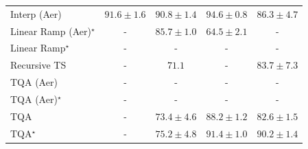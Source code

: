 \begin{tabular}{l|cccc|}
Interp (Aer) & {\cellcolor[HTML]{983404}} \color[HTML]{F1F1F1} $91.6\pm 1.6$ & {\cellcolor[HTML]{A33904}} \color[HTML]{F1F1F1} $90.8\pm 1.4$ & {\cellcolor[HTML]{702806}} \color[HTML]{F1F1F1} $94.6\pm 0.8$ & {\cellcolor[HTML]{D75908}} \color[HTML]{F1F1F1} $86.3\pm 4.7$ \\
Linear Ramp (Aer)$^\star$ & {\cellcolor[HTML]{000000}} \color[HTML]{F1F1F1} {\cellcolor{white}} \color{black} - & {\cellcolor[HTML]{DC5E0B}} \color[HTML]{F1F1F1} $85.7\pm 1.0$ & {\cellcolor[HTML]{FFFFE5}} \color[HTML]{000000} $64.5\pm 2.1$ & {\cellcolor[HTML]{000000}} \color[HTML]{F1F1F1} {\cellcolor{white}} \color{black} - \\
Linear Ramp$^\star$ & {\cellcolor[HTML]{000000}} \color[HTML]{F1F1F1} {\cellcolor{white}} \color{black} - & {\cellcolor[HTML]{000000}} \color[HTML]{F1F1F1} {\cellcolor{white}} \color{black} - & {\cellcolor[HTML]{000000}} \color[HTML]{F1F1F1} {\cellcolor{white}} \color{black} - & {\cellcolor[HTML]{000000}} \color[HTML]{F1F1F1} {\cellcolor{white}} \color{black} - \\
Recursive TS & {\cellcolor[HTML]{000000}} \color[HTML]{F1F1F1} {\cellcolor{white}} \color{black} - & {\cellcolor[HTML]{FEE99E}} \color[HTML]{000000} $71.1$ & {\cellcolor[HTML]{000000}} \color[HTML]{F1F1F1} {\cellcolor{white}} \color{black} - & {\cellcolor[HTML]{EC7014}} \color[HTML]{F1F1F1} $83.7\pm 7.3$ \\
TQA (Aer) & {\cellcolor[HTML]{000000}} \color[HTML]{F1F1F1} {\cellcolor{white}} \color{black} - & {\cellcolor[HTML]{000000}} \color[HTML]{F1F1F1} {\cellcolor{white}} \color{black} - & {\cellcolor[HTML]{000000}} \color[HTML]{F1F1F1} {\cellcolor{white}} \color{black} - & {\cellcolor[HTML]{000000}} \color[HTML]{F1F1F1} {\cellcolor{white}} \color{black} - \\
TQA (Aer)$^\star$ & {\cellcolor[HTML]{000000}} \color[HTML]{F1F1F1} {\cellcolor{white}} \color{black} - & {\cellcolor[HTML]{000000}} \color[HTML]{F1F1F1} {\cellcolor{white}} \color{black} - & {\cellcolor[HTML]{000000}} \color[HTML]{F1F1F1} {\cellcolor{white}} \color{black} - & {\cellcolor[HTML]{000000}} \color[HTML]{F1F1F1} {\cellcolor{white}} \color{black} - \\
TQA & {\cellcolor[HTML]{000000}} \color[HTML]{F1F1F1} {\cellcolor{white}} \color{black} - & {\cellcolor[HTML]{FEDA7E}} \color[HTML]{000000} $73.4\pm 4.6$ & {\cellcolor[HTML]{C44802}} \color[HTML]{F1F1F1} $88.2\pm 1.2$ & {\cellcolor[HTML]{F27D1B}} \color[HTML]{F1F1F1} $82.6\pm 1.5$ \\
TQA$^\star$ & {\cellcolor[HTML]{000000}} \color[HTML]{F1F1F1} {\cellcolor{white}} \color{black} - & {\cellcolor[HTML]{FECB5F}} \color[HTML]{000000} $75.2\pm 4.8$ & {\cellcolor[HTML]{9B3504}} \color[HTML]{F1F1F1} $91.4\pm 1.0$ & {\cellcolor[HTML]{AB3C03}} \color[HTML]{F1F1F1} $90.2\pm 1.4$ \\

\end{tabular}
